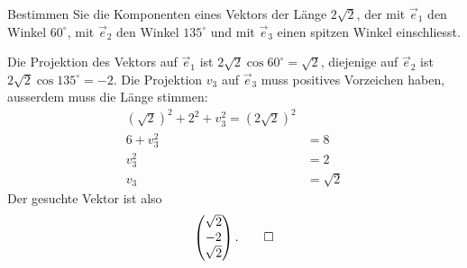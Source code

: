 Bestimmen Sie die Komponenten eines Vektors der Länge $2\sqrt{2}$,
der mit $\vec e_1$ den Winkel $60^\circ$, mit $\vec e_2$ den Winkel
$135^\circ$ und mit $\vec e_3$ einen spitzen Winkel einschliesst.


\begin{loesung}
Die Projektion des Vektors auf $\vec e_1$ ist $2\sqrt{2}\cos 60^\circ=\sqrt{2}$,
diejenige auf $\vec e_2$ ist $2\sqrt{2}\cos135^\circ=-2$. Die Projektion $v_3$
auf $\vec e_3$ muss positives Vorzeichen haben, ausserdem muss die
Länge stimmen:
\begin{align*}
(\sqrt{2})^2+2^2+v_3^2=(2\sqrt{2})^2\\
6+v_3^2&=8\\
v_3^2&=2\\
v_3&=\sqrt {2}
\end{align*}
Der gesuchte Vektor ist also
\[
\begin{pmatrix}\sqrt{2}\\-2\\\sqrt{2}\end{pmatrix}.
\qedhere
\]
\end{loesung}

